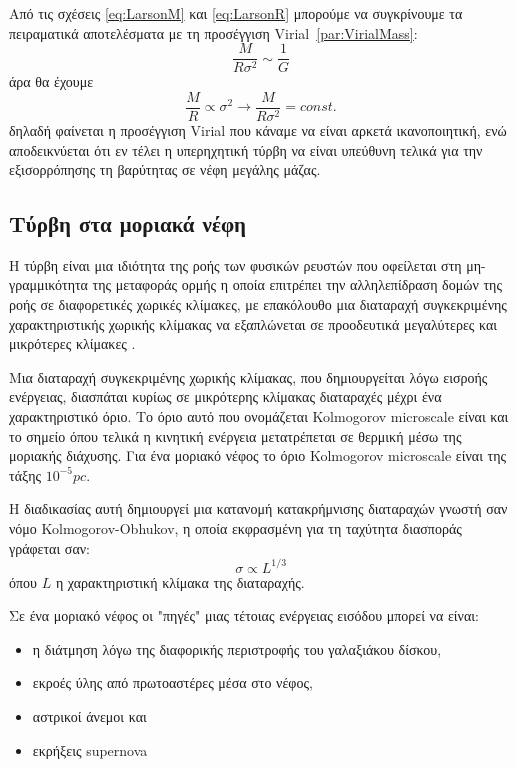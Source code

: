 \documentclass[a4paper,12pt]{memoir}
\begin{document}
Από τις σχέσεις \ref{eq:LarsonM} και \ref{eq:LarsonR} μπορούμε να συγκρίνουμε τα πειραματικά αποτελέσματα με τη προσέγγιση Virial~\ref{par:VirialMass}: 
$$
\frac{M}{R \sigma ^2}\sim \frac{1}{G}
$$
άρα θα έχουμε
\begin{equation}
\frac{M}{R}\propto \sigma ^2 \rightarrow \frac{M}{R \sigma ^2}=const.
\end{equation}
δηλαδή φαίνεται η προσέγγιση Virial που κάναμε να είναι αρκετά ικανοποιητική, ενώ αποδεικνύεται ότι εν τέλει η υπερηχητική τύρβη να είναι υπεύθυνη τελικά για την εξισορρόπησης τη βαρύτητας σε νέφη μεγάλης μάζας. 

\subsection{Τύρβη στα μοριακά νέφη}
Η τύρβη είναι μια ιδιότητα της ροής των φυσικών ρευστών που οφείλεται στη μη-γραμμικότητα της μεταφοράς ορμής η οποία επιτρέπει την αλληλεπίδραση δομών της ροής σε διαφορετικές χωρικές κλίμακες, με επακόλουθο μια διαταραχή συγκεκριμένης χαρακτηριστικής χωρικής κλίμακας να εξαπλώνεται σε προοδευτικά μεγαλύτερες και μικρότερες κλίμακες \cite{sofianos_turbulence}.

Μια διαταραχή συγκεκριμένης χωρικής κλίμακας, που δημιουργείται λόγω εισροής ενέργειας, διασπάται κυρίως σε μικρότερης κλίμακας διαταραχές μέχρι ένα χαρακτηριστικό όριο. Το όριο αυτό που ονομάζεται Kolmogorov microscale είναι και το σημείο όπου τελικά η κινητική ενέργεια μετατρέπεται σε θερμική μέσω της μοριακής διάχυσης. Για ένα μοριακό νέφος το όριο Kolmogorov microscale είναι της τάξης $10^{-5} pc$.

Η διαδικασίας αυτή δημιουργεί μια κατανομή κατακρήμνισης διαταραχών γνωστή σαν νόμο Kolmogorov-Obhukov, η οποία εκφρασμένη για τη ταχύτητα διασποράς γράφεται σαν:
\begin{equation}
\sigma \propto L^{1/3}
\end{equation} 
όπου $L$ η χαρακτηριστική κλίμακα της διαταραχής.

Σε ένα μοριακό νέφος οι "πηγές" μιας τέτοιας ενέργειας εισόδου μπορεί να είναι:
\begin{itemize}
	\item η διάτμηση λόγω της διαφορικής περιστροφής του γαλαξιάκου δίσκου,
	\item εκροές ύλης από πρωτοαστέρες μέσα στο νέφος,
	\item αστρικοί άνεμοι και
	\item εκρήξεις supernova
\end{itemize}
\end{document}
